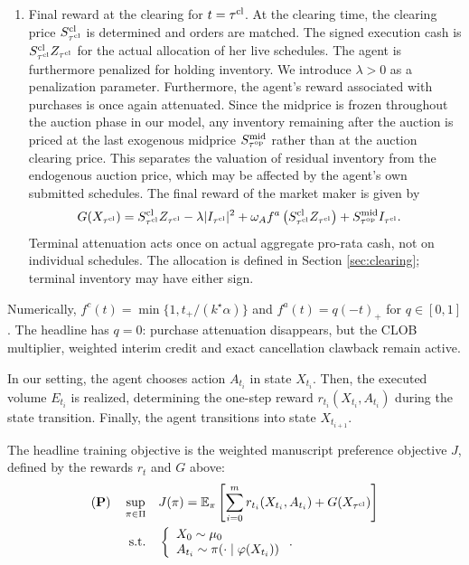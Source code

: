 \documentclass[11pt]{article}
\begin{document}
\begin{enumerate}
\item Final reward at the clearing for $t=\tau^{\mathrm{cl}}$. At the clearing time, the clearing price $S_{\tau^{\mathrm{cl}}}^{\mathrm{cl}}$ is determined and orders are matched. {The signed execution cash is $S_{\tau^{\mathrm{cl}}}^{\mathrm{cl}} Z_{\tau^{\mathrm{cl}}}$ for the actual allocation of her live schedules.} The agent is furthermore penalized for holding inventory. We introduce $\lambda > 0$ as a penalization parameter. Furthermore, the agent's reward associated with purchases is once again attenuated. Since the midprice is frozen throughout the auction phase in our model, any inventory remaining after the auction is priced at the last exogenous midprice $S^\text{mid}_{\tau^{\mathrm{op}}}$ rather than at the auction clearing price. This separates the valuation of residual inventory from the endogenous auction price, which may be affected by the agent's own submitted schedules. The final reward of the market maker is given by
\begin{align*}
    G(X_{\tau^{\mathrm{cl}}}) &= S_{\tau^{\mathrm{cl}}}^{\mathrm{cl}} Z_{\tau^{\mathrm{cl}}}- \lambda |I_{\tau^{\mathrm{cl}}}|^2 + {\omega_A} f^a\left (S_{\tau^{\mathrm{cl}}}^{\mathrm{cl}} Z_{\tau^{\mathrm{cl}}}\right) + S^\text{mid}_{\tau^{\mathrm{op}}}I_{\tau^{\mathrm{cl}}}.
\end{align*}
{Terminal attenuation acts once on actual aggregate pro-rata cash, not on individual schedules. The allocation is defined in Section \ref{sec:clearing}; terminal inventory may have either sign.}
\end{enumerate}

\begin{remark}
    {Numerically, $f^c(t)=\min\{1,t_+/(k^\star\alpha)\}$ and $f^a(t)=q(-t)_+$ for $q\in[0,1]$. The headline has $q=0$: purchase attenuation disappears, but the CLOB multiplier, weighted interim credit and exact cancellation clawback remain active.}
\end{remark}

In our setting, the agent chooses action $A_{t_i}$ in state $X_{t_i}$. Then, the executed volume $E_{t_i}$ is realized, determining the one-step reward $r_{t_i}(X_{t_i},A_{t_i})$ during the state transition. Finally, the agent transitions into state $X_{t_{i+1}}$.\vspace{0.5em}

{The headline training objective is the weighted manuscript preference objective $J$, defined by the rewards $r_t$ and $G$ above:}
\begin{align*}
    (\mathbf{P})\quad \sup_{\pi \in \Pi} \quad & J(\pi) = \mathbb{E}_\pi\left [\sum_{i=0}^{m} r_{t_i}(X_{t_i},A_{t_i}) + G(X_{\tau^{\mathrm{cl}}}) \right] \nonumber \\
    \text{s.t.} \quad & \left \{\begin{array}{l}
    X_0 \sim \mu_0  \\
    A_{t_i} \sim \pi(\cdot \mid \varphi(X_{t_i}))
\end{array}\right..
\end{align*}
\end{document}
